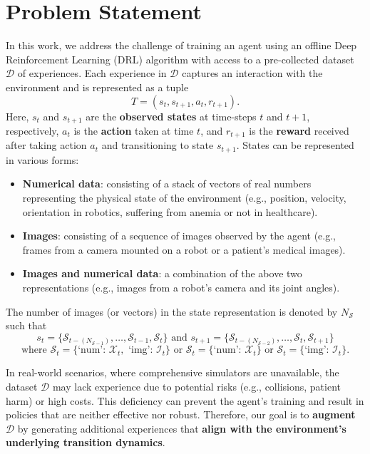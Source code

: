 \section{Problem Statement}

In this work, we address the challenge of training an agent using
an offline Deep Reinforcement Learning (DRL) algorithm with access 
to a pre-collected dataset \( \mathcal{D} \) of experiences. 
Each experience in \( \mathcal{D} \) captures an interaction with
the environment and is represented as a tuple
\[ T = (s_t, s_{t+1}, a_t, r_{t+1}) .\] Here, \( s_t \)
and \( s_{t+1} \) are the \textbf{observed states} at time-steps
\( t \) and \( t+1 \), respectively, \( a_t \) is the \textbf{action}
taken at time \( t \), and \( r_{t+1} \) is the \textbf{reward} received
after taking action \( a_t \) and transitioning to state \( s_{t+1} \).
States can be represented in various forms:
\begin{itemize}
    \item \textbf{Numerical data}: consisting of a stack of vectors of
    real numbers representing the physical state of the environment
    (e.g., position, velocity, orientation in robotics,
    suffering from anemia or not in healthcare).
    \item \textbf{Images}: consisting of a sequence of images
    observed by the agent (e.g., frames from a camera mounted on a
    robot or a patient's medical images).
    \item \textbf{Images and numerical data}: a combination of the
    above two representations (e.g., images from a robot's camera
    and its joint angles).
\end{itemize}
The number of images (or vectors) in the state representation
is denoted by \( N_{\mathcal{S}} \) such that
\[ s_t = \{ \mathcal{S}_{t-(N_{\mathcal{S}-1})}, \ldots,
\mathcal{S}_{t-1}, \mathcal{S}_t \} \text{  and  }
s_{t+1} = \{ \mathcal{S}_{t-(N_{\mathcal{S}-2})}, \ldots,
\mathcal{S}_t, \mathcal{S}_{t+1} \} \]
\[
    \text{where } \mathcal{S}_t =
    \{\text{`num': } \mathcal{X}_t, \text{ `img': } \mathcal{I}_t\} \text{ or }
    \mathcal{S}_t = \{\text{`num': } \mathcal{X}_t\}
    \text{ or } \mathcal{S}_t = \{\text{`img': } \mathcal{I}_t\}.
\]

In real-world scenarios, where comprehensive simulators are unavailable,
the dataset \( \mathcal{D} \) may lack experience due
to potential risks (e.g., collisions, patient harm) or high costs.
This deficiency can prevent the agent's training and result in policies
that are neither effective nor robust. Therefore, our goal is to \textbf{augment}
\( \mathcal{D} \) by generating additional experiences that
\textbf{align with the environment's underlying transition dynamics}.

